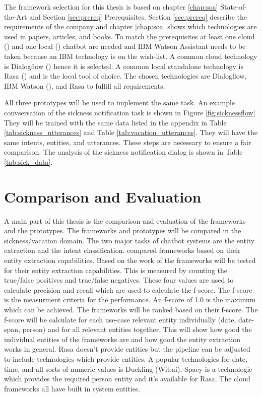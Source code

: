 The framework selection for this thesis is based on chapter \ref{chap:soa} State-of-the-Art and Section \ref{sec:prereq} Prerequisites.
Section \ref{sec:prereq} describe the requirements of the company and chapter \ref{chap:soa} shows which technologies are 
used in papers, articles, and books.
To match the prerequisites at least one cloud (\citet{braunEvaluatingNLU, rahman2017programming}) and one local (\citet{braunEvaluatingNLU}) chatbot are needed and IBM Watson Assistant needs to be taken because an IBM technology is on the wish-list.
A common cloud technology is Dialogflow (\citet{braunEvaluatingNLU, dutta2017developing, singhbuilding, buiildChatbotsPython, rahman2017programming, ieee2018watson}) hence it is selected.
A common local standalone technology is Rasa (\citet{braunEvaluatingNLU, singhbuilding, rasabocklisch2017, buiildChatbotsPython, gregori2017evaluation}) and is the local tool of choice.
The chosen technologies are Dialogflow, IBM Watson (\citet{rahman2017programming, pharmacybot, ieee2018watson, gregori2017evaluation}), and Rasa to fulfill all requirements.

All three prototypes will be used to implement the same task.
An example convsersation of the sickness notification task is shown in Figure \ref{fig:sicknessflow}
They will be trained with the same data listed in the appendix 
in Table \ref{tab:sickness_utterances} and Table \ref{tab:vacation_utterances}.
They will have the same intents, entities, and utterances.
These steps are necessary to ensure a fair comparison.
The analysis of the sickness notification dialog is shown in Table \ref{tab:sick_data}.

\section{Comparison and Evaluation}
A main part of this thesis is the comparison and evaluation of the 
frameworks and the prototypes.
The frameworks and prototypes will be compared in the sickness/vacation domain.
The two major tasks of chatbot systems are the entity extraction and the intent 
classification.
\citet{geyer2016named} compared frameworks based on their entity extraction
capabilities.
Based on the work of \citet{geyer2016named} the frameworks will be tested 
for their entity extraction capabilities.
This is measured by counting the true/false positives and true/false negatives.
These four values are used to calculate precision and recall which 
are used to calculate the f-score.
The f-score is the measurment criteria for the performance.
An f-score of 1.0 is the maximum which can be achieved.
The frameworks will be ranked based on their f-score.
The f-score will be calculate for each use-case relevant entity 
individually (date, date-span, person) and for all relevant entities
together.
This will show how good the individual entities of the frameworks are 
and how good the entity extraction works in general.
Rasa doesn't provide entities but the pipeline can be 
adjusted to include technologies which provide entities.
A popular technologies for date, time, and all sorts of 
numeric values is Duckling (Wit.ai).
Spacy is a technologie which provides the required person entity and 
it's available for Rasa.
The cloud frameworks all have built in system entities. 

